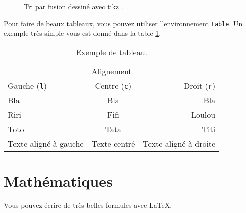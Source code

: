\documentclass{rapport}
\def\Latex{\LaTeX\xspace}
\begin{document}
\begin{figure}
        \caption{Tri par fusion dessiné avec tikz \textcolor{magenta}{}.\label{fig:sort}}
      \end{figure}
        
      Pour faire de beaux tableaux, vous pouvez utiliser l'environnement \verb|table|. Un exemple très simple vous est donné dans la table \ref{tab:ex}.
      
      \begin{table}
        \centering
        \begin{tabular}{l c r}
          \hline
          \multicolumn{3}{c}{Alignement}\\
          Gauche (\verb|l|) & Centre (\verb|c|) & Droit (\verb|r|)\\\hline
          Bla & Bla & Bla\\
          Riri & Fifi & Loulou\\
          Toto & Tata & Titi\\
          Texte aligné à gauche & Texte centré & Texte aligné à droite\\\hline
        \end{tabular}
        \caption{Exemple de tableau.\label{tab:ex}}
      \end{table}
      
    \section{Mathématiques}
        
      Vous pouvez écrire de très belles formules avec \Latex.
      
\end{document}
